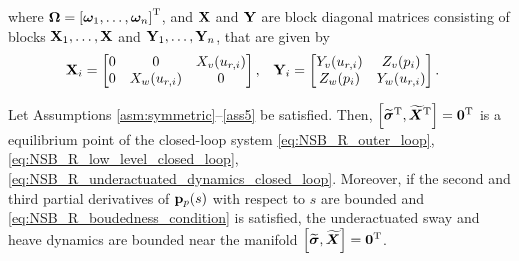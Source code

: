 where $\bm{\Omega} = \left[\bm{\omega}_1, \ldots, \bm{\omega}_n\right]^{\mathrm{T}}$, and $\mathbf{X}$ and $\mathbf{Y}$ are block diagonal matrices consisting of blocks $\mathbf{X}_1, \ldots, \mathbf{X}$ and $\mathbf{Y}_1, \ldots, \mathbf{Y}_n$, that are given by 
\begin{align}
    \mathbf{X}_i &= 
    \begin{bmatrix}
        0 & 0 & X_v(u_{r, i}) \\
        0 & X_w(u_{r, i}) & 0
    \end{bmatrix}, &
    \mathbf{Y}_i &=
    \begin{bmatrix}
        Y_v(u_{r,i}) & Z_v(p_i) \\
        Z_w(p_i) & Y_w(u_{r, i})
    \end{bmatrix}.
\end{align}


\begin{theorem} \label{thm_NSB_R}
    Let Assumptions \ref{asm:symmetric}--\ref{ass5} be satisfied.
    Then, $\left[\widetilde{\bm{\sigma}}^{\mathrm{T}}, \widetilde{\bm{X}}^{\mathrm{T}}\right] = \mathbf{0}^{\mathrm{T}}$ is a  equilibrium point of the closed-loop system \eqref{eq:NSB_R_outer_loop}, \eqref{eq:NSB_R_low_level_closed_loop}, \eqref{eq:NSB_R_underactuated_dynamics_closed_loop}.
    Moreover, if the second and third partial derivatives of $\mathbf{p}_p(s)$ with respect to $s$ are bounded and \eqref{eq:NSB_R_boudedness_condition} is satisfied, the underactuated sway and heave dynamics are bounded near the manifold $\left[\widetilde{\bm{\sigma}}, \widetilde{\bm{X}}\right] = \mathbf{0}^{\mathrm{T}}$.
\end{theorem}

